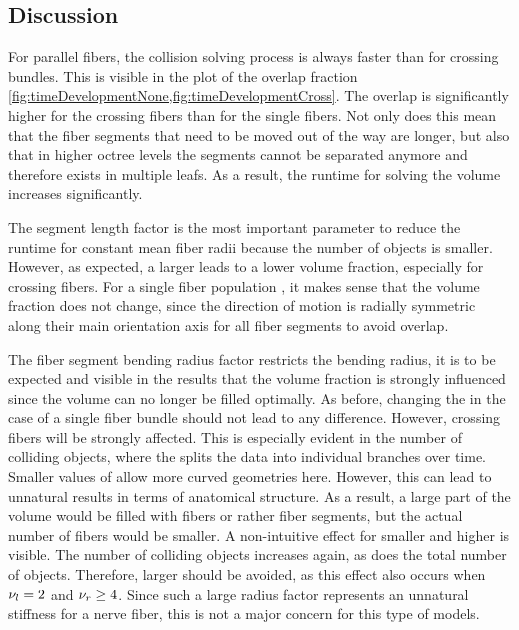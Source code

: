 \subsection{Discussion}
%
For parallel fibers, the collision solving process is always faster than for crossing bundles.
This is visible in the plot of the overlap fraction \cref{fig:timeDevelopmentNone,fig:timeDevelopmentCross}.
The overlap is significantly higher for the crossing fibers than for the single fibers.
Not only does this mean that the fiber segments that need to be moved out of the way are longer, but also that in higher octree levels the segments cannot be separated anymore and therefore exists in multiple leafs.
As a result, the runtime for solving the volume increases significantly.
\par
%
The segment length factor \segLengthFactor{} is the most important parameter to reduce the runtime for constant mean fiber radii \fiberRadiusMean{} because the number of objects is smaller.
However, as expected, a larger \segLengthFactor{} leads to a lower volume fraction, especially for crossing fibers.
For a single fiber population \pfbs{}, it makes sense that the volume fraction does not change, since the direction of motion is radially symmetric along their main orientation axis for all fiber segments to avoid overlap.
\par
%
The fiber segment bending radius factor \segRadiusFactor{} restricts the bending radius, it is to be expected and visible in the results that the volume fraction is strongly influenced since the volume can no longer be filled optimally.
As before, changing the \segRadiusFactor{} in the case of a single fiber bundle should not lead to any difference.
However, crossing fibers will be strongly affected.
This is especially evident in the number of colliding objects, where the \segRadiusFactor{} splits the data into individual branches over time.
Smaller values of \segRadiusFactor{} allow more curved geometries here.
However, this can lead to unnatural results in terms of anatomical structure.
As a result, a large part of the volume would be filled with fibers or rather fiber segments, but the actual number of fibers would be smaller.
A non-intuitive effect for smaller \segLengthFactor{} and higher \segRadiusFactor{} is visible.
The number of colliding objects increases again, as does the total number of objects.
Therefore, larger \segRadiusFactor{} should be avoided, as this effect also occurs when $\textnormal{$\nu_{l}$} = 2$ and $\textnormal{$\nu_{r}$} \geq 4$.
Since such a large radius factor represents an unnatural stiffness for a nerve fiber, this is not a major concern for this type of models.
